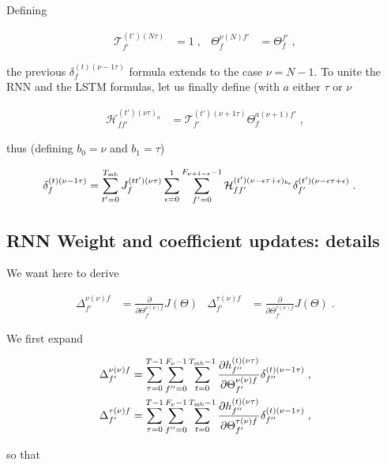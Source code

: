 \begin{subappendices}
Defining

\begin{align}
\mathcal{T}^{(t')(N\tau)}_{f'}&=1\;,&
%
\Theta^{\nu(N)f'}_{f}&=\Theta^{f'}_{f}\;,
\end{align}

the previous $ \delta^{(t)(\nu-1\tau)}_f$ formula extends to the case $\nu =N-1$. To unite the RNN and the LSTM formulas, let us finally define (with $a$ either $\tau$ or $\nu$

\begin{align}
\mathcal{H}^{(t')(\nu\tau)_a}_{ff'}&=\mathcal{T}^{(t')(\nu+1\tau)}_{f'}\Theta^{a(\nu+1)f'}_{f}\;,
\end{align}

thus (defining $b_0=\nu$ and $b_1=\tau$)

\begin{align}
\delta^{(t)(\nu-1\tau)}_f&=
%
\sum_{t'=0}^{T_{{\rm mb}}}J^{(tt')(\nu\tau)}_f\sum_{\epsilon=0}^{1}\sum_{f'=0}^{F_{\nu+1-\epsilon}-1}
%
\mathcal{H}^{(t')(\nu-\epsilon\tau+\epsilon)_{b_\epsilon}}_{ff'}\delta^{(t')(\nu-\epsilon\tau+\epsilon)}_{f'}\;.
\end{align}


\subsection{RNN Weight and coefficient updates: details} \label{sec:rnncoefficient}

We want here to derive

\begin{align}
\Delta^{\nu(\nu)f}_{f'}&=\frac{\partial}{\partial \Theta^{\nu(\nu)f}_{f'}} J(\Theta)&
%
\Delta^{\tau(\nu)f}_{f'}&=\frac{\partial}{\partial \Theta^{\tau(\nu)f}_{f'}} J(\Theta)\;.
\end{align}

We first expand

\begin{align}
\Delta^{\nu(\nu)f}_{f'}&=\sum_{\tau=0}^{T-1}\sum_{f''=0}^{F_\nu-1}\sum_{t=0}^{T_{{\rm mb}}-1}
%
\frac{\partial h^{(t)(\nu\tau)}_{f''}}{\partial \Theta^{\nu(\nu)f}_{f'}}
%
\delta^{(t)(\nu-1\tau)}_{f''}\;,\notag\\
%
\Delta^{\tau(\nu)f}_{f'}&=\sum_{\tau=0}^{T-1}\sum_{f''=0}^{F_\nu-1}\sum_{t=0}^{T_{{\rm mb}}-1}
%
\frac{\partial h^{(t)(\nu\tau)}_{f''}}{\partial \Theta^{\tau(\nu)f}_{f'}}
%
\delta^{(t)(\nu-1\tau)}_{f''}\;,
\end{align}

so that


\end{subappendices}
